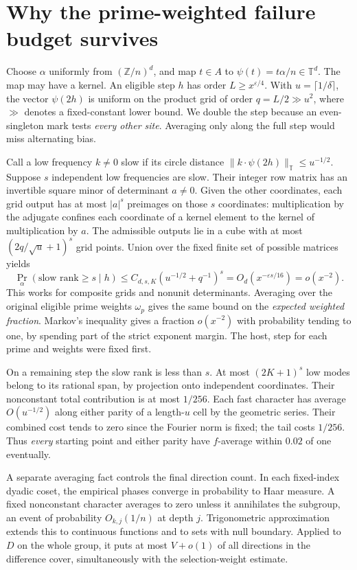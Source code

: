 \documentclass[12pt,letterpaper]{article}
\newcommand{\pagepart}[1]{\clearpage\section{#1}}
\begin{document}
\pagepart{Why the prime-weighted failure budget survives}
Choose \(\alpha\) uniformly from \((\mathbb Z/n)^d\), and map \(t\in A\) to \(\psi(t)=t\alpha/n\in\mathbb T^d\). The map may have a kernel. An eligible step \(h\) has order \(L\ge x^{\varepsilon/4}\). With \(u=\lceil1/\delta\rceil\), the vector \(\psi(2h)\) is uniform on the product grid of order \(q=L/2\gg u^2\), where \(\gg\) denotes a fixed-constant lower bound. We double the step because an even-singleton mark tests \emph{every other site}. Averaging only along the full step would miss alternating bias.

Call a low frequency \(k\ne0\) slow if its circle distance \(\|k\cdot\psi(2h)\|_{\mathbb T}\le u^{-1/2}\). Suppose \(s\) independent low frequencies are slow. Their integer row matrix has an invertible square minor of determinant \(a\ne0\). Given the other coordinates, each grid output has at most \(|a|^s\) preimages on those \(s\) coordinates: multiplication by the adjugate confines each coordinate of a kernel element to the kernel of multiplication by \(a\). The admissible outputs lie in a cube with at most \((2q/\sqrt u+1)^s\) grid points. Union over the fixed finite set of possible matrices yields
\[
 \Pr_\alpha(\text{slow rank}\ge s\mid h)
 \le C_{d,s,K}(u^{-1/2}+q^{-1})^s
 =O_d(x^{-\varepsilon s/16})=o(x^{-2}).
\]
This works for composite grids and nonunit determinants. Averaging over the original eligible prime weights \(\omega_p\) gives the same bound on the \emph{expected weighted fraction}. Markov's inequality gives a fraction \(o(x^{-2})\) with probability tending to one, by spending part of the strict exponent margin. The host, step for each prime and weights were fixed first.

On a remaining step the slow rank is less than \(s\). At most \((2K+1)^s\) low modes belong to its rational span, by projection onto independent coordinates. Their nonconstant total contribution is at most \(1/256\). Each fast character has average \(O(u^{-1/2})\) along either parity of a length-\(u\) cell by the geometric series. Their combined cost tends to zero since the Fourier norm is fixed; the tail costs \(1/256\). Thus \emph{every} starting point and either parity have \(f\)-average within \(0.02\) of one eventually.

A separate averaging fact controls the final direction count. In each fixed-index dyadic coset, the empirical phases converge in probability to Haar measure. A fixed nonconstant character averages to zero unless it annihilates the subgroup, an event of probability \(O_{k,j}(1/n)\) at depth \(j\). Trigonometric approximation extends this to continuous functions and to sets with null boundary. Applied to \(D\) on the whole group, it puts at most \(V+o(1)\) of all directions in the difference cover, simultaneously with the selection-weight estimate.
\end{document}

